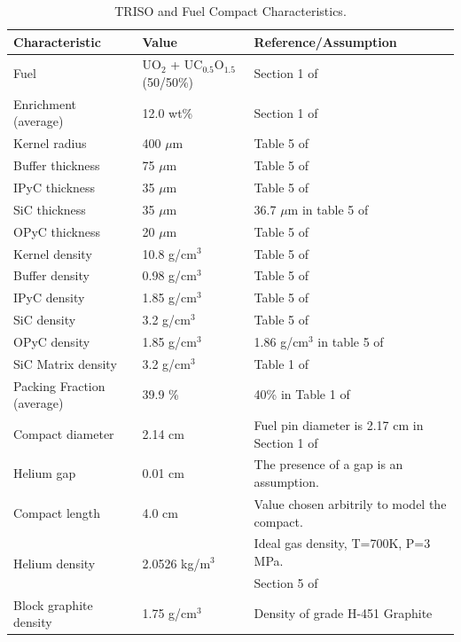 \documentclass[11pt,letterpaper]{article}
\begin{document}
	\begin{table}[htbp!]
		\centering
	    \caption{TRISO and Fuel Compact Characteristics.}
	    \label{tab:compact}
		\begin{tabular}{l|l|l}
		\hline
		Characteristic              & Value             & Reference/Assumption \\ \hline
		Fuel                        & UO$_2$ + UC$_{0.5}$O$_{1.5}$ (50/50\%)  & Section 1 of \cite{hawari_development_2018} \\
		Enrichment (average)        & 12.0 wt\%         & Section 1 of \cite{hawari_development_2018}  \\
		Kernel radius               & 400 $\mu$m        & Table 5 of \cite{hawari_development_2018}  \\
		Buffer thickness            & 75 $\mu$m         & Table 5 of \cite{hawari_development_2018}  \\
		IPyC thickness              & 35 $\mu$m         & Table 5 of \cite{hawari_development_2018}  \\
		SiC thickness               & 35 $\mu$m         & 36.7 $\mu$m in table 5 of \cite{hawari_development_2018}  \\
		OPyC thickness              & 20 $\mu$m         & Table 5 of \cite{hawari_development_2018}  \\
    	Kernel density              & 10.8 g/cm$^3$     & Table 5 of \cite{hawari_development_2018}  \\
		Buffer density              & 0.98 g/cm$^3$     & Table 5 of \cite{hawari_development_2018}  \\
		IPyC density                & 1.85 g/cm$^3$     & Table 5 of \cite{hawari_development_2018}  \\
		SiC density                 & 3.2  g/cm$^3$     & Table 5 of \cite{hawari_development_2018}  \\
		OPyC density                & 1.85 g/cm$^3$     & 1.86 g/cm$^3$ in table 5 of \cite{hawari_development_2018}  \\
		SiC Matrix density          & 3.2 g/cm$^3$      & Table 1 of \cite{hawari_development_2018}  \\
		Packing Fraction (average)  & 39.9 \%           & 40\% in Table 1 of \cite{hawari_development_2018}  \\
		Compact diameter            & 2.14 cm           & Fuel pin diameter is 2.17 cm in Section 1 of \cite{hawari_development_2018}  \\
		Helium gap                  & 0.01 cm           & The presence of a gap is an assumption. \\
		Compact length              & 4.0 cm            & Value chosen arbitrily to model the compact. \\ 
        \multirow{ 2}{*}{Helium density} & \multirow{ 2}{*}{2.0526 kg/m$^3$}  & Ideal gas density, T=700K, P=3 MPa. \\
                                    &                   & Section 5 of \cite{hawari_development_2018} \\
        Block graphite density      & 1.75 g/cm$^3$     & Density of grade H-451 Graphite \cite{gougar_prismatic_2010} \\ \hline


\end{tabular}
\end{table}
\end{document}
